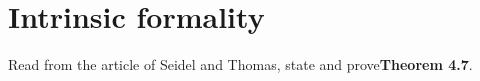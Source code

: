 
\section{Intrinsic formality}

	Read from the article of Seidel and Thomas,
	state and prove\textbf{Theorem 4.7}.
	